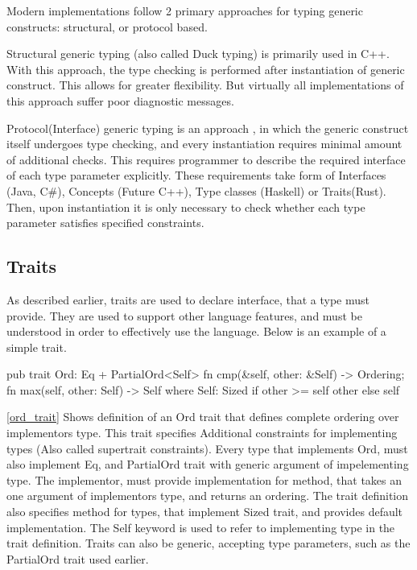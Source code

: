 Modern implementations follow 2 primary approaches for typing generic constructs: structural, or protocol based.

Structural generic typing (also called Duck typing) is primarily used in C++. With this approach, the type
checking is performed after instantiation of generic construct. This allows for greater flexibility.
But virtually all implementations of this approach suffer poor diagnostic messages\cite{Traver:2010:CEM:1863617.1945532}.

Protocol(Interface) generic typing is an approach , in which the generic construct itself undergoes type checking, and
every instantiation requires minimal amount of additional checks. This requires programmer to describe the required interface
of each type parameter explicitly. These requirements take form of Interfaces (Java, C\#), Concepts (Future C++),
Type classes (Haskell) or Traits(Rust). Then, upon instantiation it is only necessary to check whether
each type parameter satisfies specified constraints.

\subsection{Traits}
As described earlier, traits are used to declare interface, that a type must provide. They are used to support
other language features, and must be understood in order to effectively use the language.
Below is an example of a simple trait.


\begin{code}[language=rust,label={ord_trait},caption={Trait definition}]
    pub trait Ord: Eq + PartialOrd<Self> {
        fn cmp(&self, other: &Self) -> Ordering;
        fn max(self, other: Self) -> Self where Self: Sized {
            if other >= self { other } else { self }
        }
    }
\end{code}

\autoref{ord_trait} Shows definition of an Ord trait that defines complete ordering over implementors type. This trait specifies Additional constraints for implementing types
(Also called supertrait constraints). Every type that implements Ord, must also implement Eq, and PartialOrd trait with generic
argument of impelementing type. The implementor, must provide implementation for  method, that takes an one argument of implementors type,
and returns an ordering. The trait definition also specifies  method for types, that implement Sized trait, and provides default
implementation.
The Self keyword is used to refer to implementing type in the trait definition.
Traits can also be generic, accepting type parameters, such as the PartialOrd trait used earlier.

